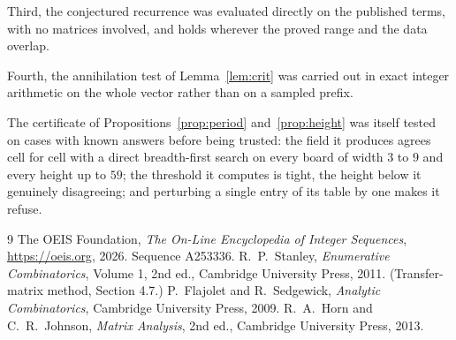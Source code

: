 \documentclass[11pt,a4paper]{article}
\theoremstyle{plain}
\theoremstyle{definition}
\begin{document}
Third, the conjectured recurrence was evaluated directly on the published terms, with no
matrices involved, and holds wherever the proved range and the data overlap.

Fourth, the annihilation test of Lemma~\ref{lem:crit} was carried out in exact integer
arithmetic on the whole vector rather than on a sampled prefix.

The certificate of Propositions~\ref{prop:period} and~\ref{prop:height} was itself tested
on cases with known answers before being trusted: the field it produces agrees cell for cell
with a direct breadth-first search on every board of width $3$ to $9$ and every height up to
$59$; the threshold it computes is tight, the height below it genuinely disagreeing; and
perturbing a single entry of its table by one makes it refuse.

\begin{thebibliography}{9}
 The OEIS Foundation, \emph{The On-Line Encyclopedia of Integer
Sequences}, \url{https://oeis.org}, 2026. Sequence A253336.
 R.~P.~Stanley, \emph{Enumerative Combinatorics}, Volume 1, 2nd ed.,
Cambridge University Press, 2011. (Transfer-matrix method, Section 4.7.)
 P.~Flajolet and R.~Sedgewick, \emph{Analytic Combinatorics}, Cambridge
University Press, 2009.
 R.~A.~Horn and C.~R.~Johnson, \emph{Matrix Analysis}, 2nd ed., Cambridge
University Press, 2013.
\end{thebibliography}
\end{document}
